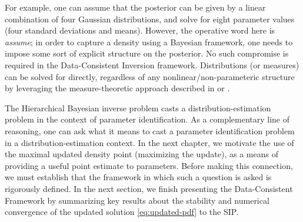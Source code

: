 For example, one can assume that the posterior can be given by a linear combination of four Gaussian distributions, and solve for eight parameter values (four standard deviations and means).
However, the operative word here is \emph{assume}; in order to capture a density using a Bayesian framework, one needs to impose some sort of explicit structure on the posterior.
No such compromise is required in the Data-Consistent Inversion framework.
Distributions (or measures) can be solved for directly, regardless of any nonlinear/non-parameteric structure by leveraging the measure-theoretic approach described in \cite{BE13} or \cite{BJW18}.

The Hierarchical Bayesian inverse problem casts a distribution-estimation problem in the context of parameter identification.
As a complementary line of reasoning, one can ask what it means to cast a parameter identification problem in a distribution-estimation context.
In the next chapter, we motivate the use of the maximal updated density point (maximizing the update), as a means of providing a useful point estimate to parameters.
Before making this connection, we must establish that the framework in which such a question is asked is rigorously defined.
In the next section, we finish presenting the Data-Consistent Framework by summarizing key results about the stability and numerical convergence of the updated solution \eqref{eq:updated-pdf} to the SIP.

\FloatBarrier
